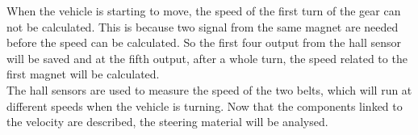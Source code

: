 When the vehicle is starting to move, the speed of the first turn of the gear can not be calculated. This is because two signal from the same magnet are needed before the speed can be calculated. So the first four output from the hall sensor will be saved and at the fifth output, after a whole turn, the speed related to the first magnet will be calculated.\\

The hall sensors are used to measure the speed of the two belts, which will run at different speeds when the vehicle is turning. Now that the components linked to the velocity  are described, the steering material will be analysed.
